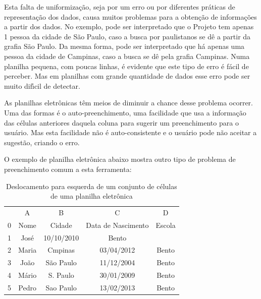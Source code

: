 \documentclass[
12pt,		%
openright,	%
twoside,  %
a4paper,			%
chapter=TITLE,		%
english,			%
french,				%
spanish,			%
brazil				%
]{USPSC-classe/USPSC}
\begin{document}
Esta falta de uniformiza\c{c}\~ao, seja por um erro ou por diferentes pr\'aticas de representa\c{c}\~ao dos dados, causa muitos problemas para a obten\c{c}\~ao de informa\c{c}\~oes a partir dos dados. No exemplo, pode ser interpretado que o Projeto tem apenas 1 pessoa da cidade de S\~ao Paulo, caso a busca por paulistanos se d\^e a partir da grafia \textquotedbl S\~ao Paulo\textquotedbl . Da mesma forma, pode ser interpretado que h\'a apenas uma pessoa da cidade de Campinas, caso a busca se d\^e pela grafia \textquotedbl Campinas\textquotedbl . Numa planilha pequena, com poucas linhas, \'e evidente que este tipo de erro \'e f\'acil de perceber. Mas em planilhas com grande quantidade de dados esse erro pode ser muito dif\'{\i}cil de detectar.










As planilhas eletr\^onicas t\^em meios de diminuir a chance desse problema ocorrer. Uma das formas \'e o auto-preenchimento, uma facilidade que usa a informa\c{c}\~ao das c\'elulas anteriores daquela coluna para sugerir um preenchimento para o usu\'ario. Mas esta facilidade n\~ao \'e auto-consistente e o usu\'ario pode n\~ao aceitar a sugest\~ao, criando o erro.










O exemplo de planilha eletr\^onica abaixo mostra outro tipo de problema de preenchimento comum a esta ferramenta:














\begin{table}[htb]
\tiny
\caption{\label{f6feaa39313aa0691b7fdadc84175a203e68bf77}Deslocamento para esquerda de um conjunto de c\'elulas de uma planilha eletr\^onica}

\centering
\begin{tabular}{|c|c|c|c|c|}
\hline
  &  A  &  B  &  C  &  D  \\
0 & Nome  &  Cidade  &  Data de Nascimento  &  Escola \\
1 & Jos\'e  &  10/10/2010  &  Bento  &   \\
2 & Maria  &  Cmpinas  &  03/04/2012  &  Bento \\
3 & Jo\~ao  &  S\~ao Paulo  &  11/12/2004  &  Bento \\
4 & M\'ario  &  S. Paulo  &  30/01/2009  &  Bento \\
5 & Pedro  &  Sao Paulo  &  13/02/2013  &  Bento \\
\hline
\end{tabular}
\end{table}
\end{document}
